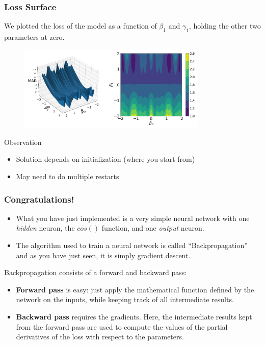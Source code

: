 \documentclass{beamer}
\begin{document}
\begin{frame}
\frametitle{Loss Surface}

We plotted the loss of the model as a function of $\beta_1$ and $\gamma_1$, holding the other two parameters at zero.

 \begin{figure}
\includegraphics[width=0.8\textwidth]{../figures/nonlinear_loss.png}
\end{figure}

\begin{block}{Observation}

\begin{itemize}
\item Solution depends on initialization (where you start from)
\item May need to do multiple restarts
\end{itemize}

\end{block}

\end{frame}

\begin{frame}
\frametitle{Congratulations!}

\begin{itemize}
\item What you have just implemented is a very simple neural network with one \emph{hidden} neuron, the $cos()$ function, and one \emph{output} neuron.
\item The algorithm used to train a neural network is called ``Backpropagation'' and as you have just seen, it is simply gradient descent.
\end{itemize}

Backpropagation consists of a forward and backward pass:

\begin{itemize}
\item \textbf{Forward pass} is easy: just apply the mathematical function defined by the network on the inputs, while keeping track of all intermediate results. 
\item \textbf{Backward pass} requires the gradients. Here, the intermediate results kept from the forward pass are used to compute the values of the partial derivatives of the loss with respect to the parameters.
\end{itemize}






\end{frame}
\end{document}
